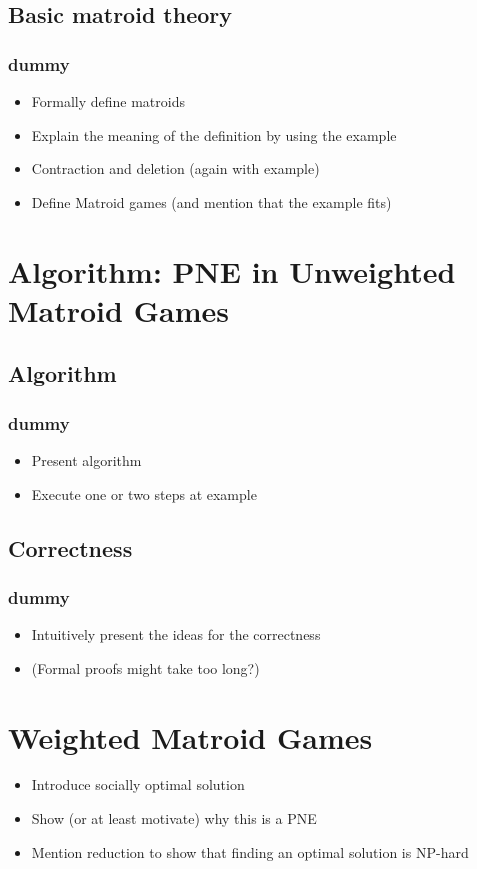 \documentclass{beamer}
\newcommand{\ft}{\frametitle{dummy}}
\begin{document}
\subsection{Basic matroid theory}
\begin{frame}
  \ft
  \begin{itemize}
    \item Formally define matroids
    \item Explain the meaning of the definition by using the example
    \item Contraction and deletion (again with example)
    \item Define Matroid games (and mention that the example fits)
  \end{itemize}
\end{frame}

\section{Algorithm: PNE in Unweighted Matroid Games}
\subsection{Algorithm}
\begin{frame}
  \ft
  \begin{itemize}
    \item Present algorithm
    \item Execute one or two steps at example
  \end{itemize}
\end{frame}

\subsection{Correctness}
\begin{frame}
  \ft
  \begin{itemize}
    \item Intuitively present the ideas for the correctness
    \item (Formal proofs might take too long?)
  \end{itemize}
\end{frame}

\section{Weighted Matroid Games}
\begin{frame}
  \begin{itemize}
    \item Introduce socially optimal solution
    \item Show (or at least motivate) why this is a PNE
    \item Mention reduction to show that finding an optimal solution is NP-hard
  \end{itemize}
\end{frame}
\end{document}
